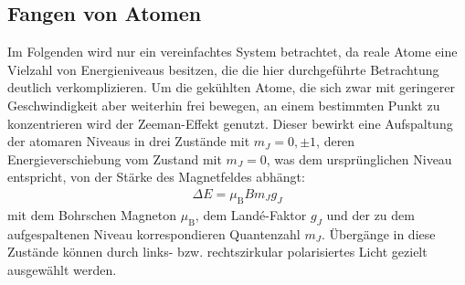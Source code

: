 \documentclass[11pt, a4paper]{article}
\numberwithin{equation}{section}
\begin{document}
\subsection{Fangen von Atomen}
Im Folgenden wird nur ein vereinfachtes System betrachtet, da reale Atome eine Vielzahl von Energieniveaus besitzen, die die hier durchgeführte Betrachtung deutlich verkomplizieren.
Um die gekühlten Atome, die sich zwar mit geringerer Geschwindigkeit aber weiterhin frei bewegen, an einem bestimmten Punkt zu konzentrieren wird der Zeeman-Effekt genutzt.
Dieser bewirkt eine Aufspaltung der atomaren Niveaus in drei Zustände mit $m_J = 0, \pm1$, deren Energieverschiebung vom Zustand mit $m_J=0$, was dem ursprünglichen Niveau entspricht, von der Stärke des Magnetfeldes abhängt:
\begin{align}
	\Delta E =\mu_\mathrm{B}Bm_Jg_J
\end{align}
mit dem Bohrschen Magneton $\mu_\mathrm{B}$, dem Landé-Faktor $g_J$ und der zu dem aufgespaltenen Niveau korrespondieren Quantenzahl $m_J$.
Übergänge in diese Zustände können durch links- bzw. rechtszirkular polarisiertes Licht gezielt ausgewählt werden.
\end{document}
